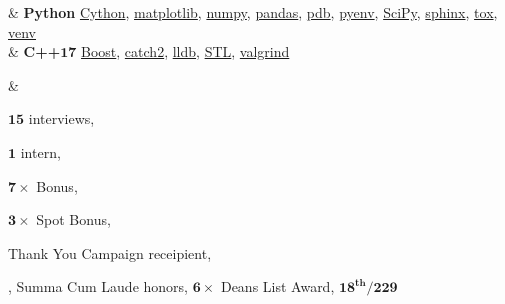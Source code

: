 \documentclass[11pt,a4paper]{article}  %
\begin{document}
\begin{ressection}
    & \textbf{Python}
        \href{https://cython.org}{Cython},
        \href{https://matplotlib.org/}{matplotlib},
        \href{https://numpy.org/}{numpy},
        \href{https://pandas.pydata.org/}{pandas},
        \href{https://docs.python.org/3/library/pdb.html}{pdb},
        \href{https://github.com/pyenv/pyenv}{pyenv},
        \href{}{SciPy},
        \href{https://www.sphinx-doc.org/en/master/}{sphinx},
        \href{https://pypi.org/project/tox/}{tox},
        \href{https://docs.python.org/3/library/venv.html}{venv}
        \\
        & \textbf{C++$\bm{17}$}
            \href{https://www.boost.org/}{Boost},
            \href{https://github.com/catchorg/Catch2}{catch2},
            \href{https://lldb.llvm.org/}{lldb},
            \href{https://www.geeksforgeeks.org/the-c-standard-template-library-stl/}{STL},
            \href{https://www.valgrind.org/}{valgrind}
\end{ressection}
%

%
\begin{ressection}
     &
    
    $\bm{15}$ interviews,
    
    $\bm{1}$ intern,
    
    $\bm{7\times}$  Bonus,
    
    $\bm{3\times}$  Spot Bonus,
    
     Thank You Campaign receipient,
    
    
    ,
    Summa Cum Laude honors, %
    $\bm{6\times}$ Deans List Award, %
    $\bm{18^\text{th}/229}$
    
\end{ressection}
\end{document}
